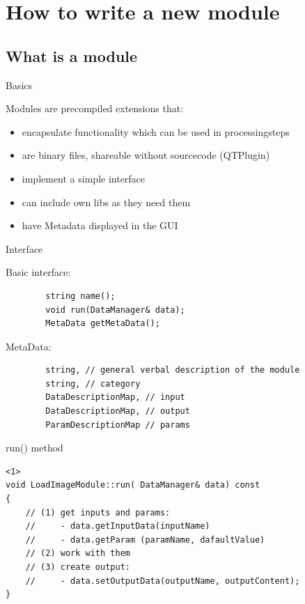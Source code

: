 \documentclass{beamer}
\begin{document}
\section{How to write a new module}

\subsection{What is a module}
\begin{frame}[fragile]{Basics}

Modules are precompiled extensions that:
	\begin{itemize}
		\item encapsulate functionality which can be used in processingsteps
		\item are binary files, shareable without sourcecode (QTPlugin)
		\item implement a simple interface
		\item can include own libs as they need them
		\item have Metadata displayed in the GUI
	\end{itemize}

\end{frame}

\begin{frame}[fragile]{Interface}



	Basic interface: \newline

	\begin{lstlisting}
		string name();
		void run(DataManager& data);
		MetaData getMetaData();
	\end{lstlisting} \pause

 	MetaData: \newline

	\begin{lstlisting}
		string, // general verbal description of the module
		string, // category
		DataDescriptionMap, // input
		DataDescriptionMap, // output
		ParamDescriptionMap // params
	\end{lstlisting}


	\pnote{
	}

\end{frame}

\begin{frame}[fragile]{run() method}

	\begin{lstlisting}<1>
void LoadImageModule::run( DataManager& data) const
{
	// (1) get inputs and params:
	//     - data.getInputData(inputName)
	//     - data.getParam (paramName, dafaultValue)
	// (2) work with them
	// (3) create output:
	//     - data.setOutputData(outputName, outputContent);
}
	\end{lstlisting}

\end{frame}
\end{document}
